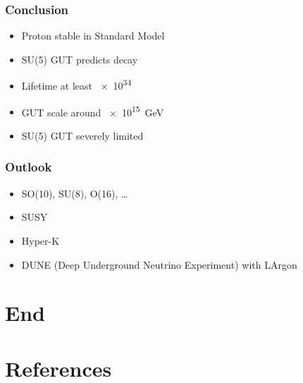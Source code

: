 \documentclass[english, fleqn]{beamer}
\begin{document}
\begin{frame}
    \frametitle{Conclusion}

    \begin{itemize}
        \item Proton stable in Standard Model
        \item SU(5) GUT predicts decay
        \item Lifetime at least \SI{e34}{\year} \parencite{super-k/proton_decay}
        \item GUT scale around \SI{e15}{\giga\electronvolt}
        \item SU(5) GUT severely limited
    \end{itemize}
\end{frame}

\begin{frame}
    \frametitle{Outlook}

    \begin{itemize}
        \item SO(10), SU(8), O(16), …
        \item SUSY
        \item Hyper-K
        \item DUNE (Deep Underground Neutrino Experiment) with LArgon
    \end{itemize}
\end{frame}


\section*{End}

\begin{frame}
    \titlepage
\end{frame}

\nocite{tikz-feynman}

\section*{References}

\begin{frame}[allowframebreaks]

    \printbibliography
\end{frame}
\end{document}
